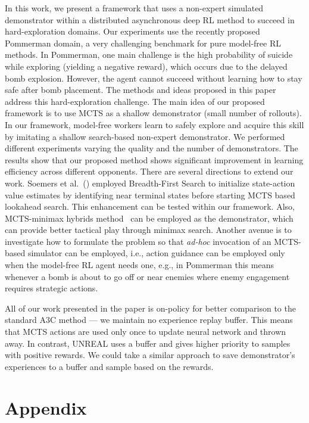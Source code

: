 \documentclass[letterpaper]{article}
\begin{document}
In this work, we present a framework that uses a non-expert simulated demonstrator within a distributed asynchronous deep RL method to succeed in hard-exploration domains. Our experiments use the recently proposed Pommerman domain, a very challenging benchmark for pure model-free RL methods. In Pommerman, one main challenge is the high probability of suicide while exploring (yielding a negative reward), which occurs due to the delayed bomb explosion. However, the agent cannot succeed without learning how to stay safe after bomb placement. The methods and ideas proposed in this paper address this hard-exploration challenge. The main idea of our proposed framework is to use MCTS as a shallow demonstrator (small number of rollouts). In our framework, model-free workers learn to safely explore and acquire this skill by imitating a shallow search-based non-expert demonstrator. We performed different experiments varying the quality and the number of demonstrators. The results show that our proposed method shows significant improvement in learning efficiency across different opponents.  There are several directions to extend our work. Soemers et al.~(\citeyear{soemers2016enhancements}) employed Breadth-First Search to initialize state-action value estimates by identifying near terminal states before starting MCTS based lookahead search. This enhancement can be tested within our framework. Also, MCTS-minimax hybrids method~\cite{baier2018mcts} can be employed as the demonstrator, which can provide better tactical play through minimax search. Another avenue is to investigate how to formulate the problem so that \emph{ad-hoc} invocation of an MCTS-based simulator can be employed, i.e., action guidance can be employed only when the model-free RL agent needs one, e.g., in Pommerman this means whenever a bomb is about to go off or near enemies where enemy engagement requires strategic actions.

All of our work presented in the paper is on-policy for better comparison to the standard A3C method --- we maintain no experience replay buffer. This means that MCTS actions are used only once to update neural network and thrown away. In contrast, UNREAL uses a buffer and gives higher priority to samples with positive rewards. We could take a similar approach to save demonstrator's experiences to a buffer and sample based on the rewards.

\vspace{-0.81mm}
\vspace{-1.43mm}
\section*{Appendix}
\end{document}
